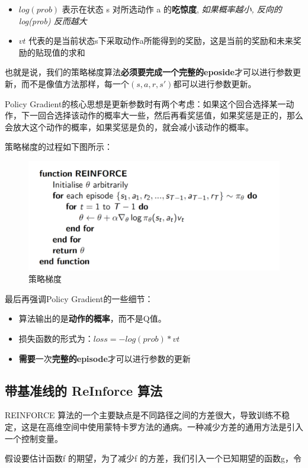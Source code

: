 \documentclass[UTF8,a4paper,12pt]{ctexbook}
\begin{document}
			\begin{itemize}
				\item $log(prob)$ 表示在状态 s 对所选动作 a 的\textbf{吃惊度}, \textit{如果概率越小, 反向的log(prob) 反而越大}
				\item $vt$ 代表的是当前状态s下采取动作a所能得到的奖励，这是当前的奖励和未来奖励的贴现值的求和
			\end{itemize}
		
			也就是说，我们的策略梯度算法\textbf{必须要完成一个完整的eposide}才可以进行参数更新，而不是像值方法那样，每一个$(s,a,r,s')$都可以进行参数更新。
			
			Policy Gradient的核心思想是更新参数时有两个考虑：如果这个回合选择某一动作，下一回合选择该动作的概率大一些，然后再看奖惩值，如果奖惩是正的，那么会放大这个动作的概率，如果奖惩是负的，就会减小该动作的概率。
			
			策略梯度的过程如下图所示：
			\begin{figure}[H]
				\centering
				\includegraphics[width=.8\linewidth]{PolicyGradient}
				\caption{策略梯度}
			\end{figure}
			
			最后再强调Policy Gradient的一些细节：
			\begin{itemize}
				\item 算法输出的是\textbf{动作的概率}，而不是Q值。
				\item 损失函数的形式为：$loss= -log(prob)*vt$
				\item \textbf{需要}一次\textbf{完整的episode}才可以进行参数的更新
			\end{itemize}
		
		\subsection{带基准线的 ReInforce 算法}
			REINFORCE 算法的一个主要缺点是不同路径之间的方差很大，导致训练不稳定，这是在高维空间中使用蒙特卡罗方法的通病。一种减少方差的通用方法是引入一个控制变量。
			
			假设要估计函数f 的期望，为了减少f 的方差，我们引入一个已知期望的函数g，令
			
\end{document}
